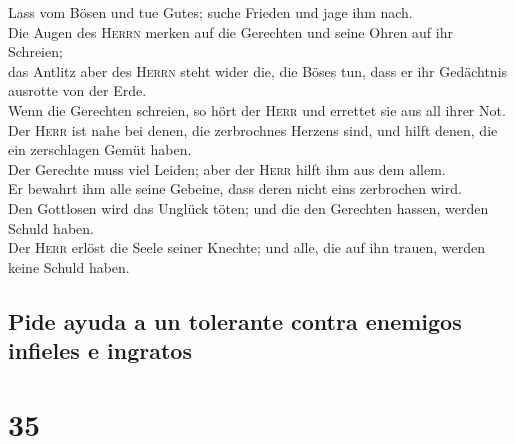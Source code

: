  Lass vom Bösen und tue Gutes; suche Frieden und jage ihm
nach.\\
 Die Augen des \textsc{Herrn} merken auf die Gerechten
und seine Ohren auf ihr Schreien;\\
 das Antlitz aber des \textsc{Herrn} steht wider die, die
Böses tun, dass er ihr Gedächtnis ausrotte von der Erde.\\
 Wenn die Gerechten schreien, so hört der \textsc{Herr}
und errettet sie aus all ihrer Not.\\
 Der \textsc{Herr} ist nahe bei denen, die zerbrochnes
Herzens sind, und hilft denen, die ein zerschlagen Gemüt haben.\\
 Der Gerechte muss viel Leiden; aber der \textsc{Herr}
hilft ihm aus dem allem.\\
 Er bewahrt ihm alle seine Gebeine, dass deren nicht eins
zerbrochen wird.\\
 Den Gottlosen wird das Unglück töten; und die den
Gerechten hassen, werden Schuld haben.\\
 Der \textsc{Herr} erlöst die Seele seiner Knechte; und
alle, die auf ihn trauen, werden keine Schuld haben.

\hypertarget{pide-ayuda-a-un-tolerante-contra-enemigos-infieles-e-ingratos}{%
\subsection{Pide ayuda a un tolerante contra enemigos infieles e
ingratos}\label{pide-ayuda-a-un-tolerante-contra-enemigos-infieles-e-ingratos}}

\hypertarget{section-34}{%
\section{35}\label{section-34}}

